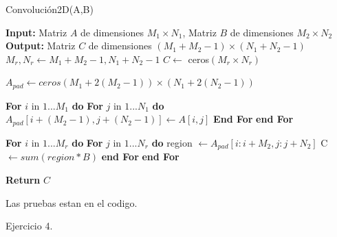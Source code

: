 \documentclass[11pt]{article}
\begin{document}
\begin{algorithm}
    \caption{Convolución2D(A,B)} %
    \begin{algorithmic}[1]
    \State \textbf{Input:} Matriz $A$ de dimensiones $M_1 \times N_1$, Matriz $B$ de dimensiones $M_2 \times N_2$
    \State \textbf{Output:} Matriz $C$ de dimensiones $(M_1 + M_2 - 1) \times (N_1 + N_2 - 1)$
    \State $M_r, N_r \leftarrow M_1 + M_2 - 1,  N_1 + N_2 - 1$
    \State  $C \leftarrow$ ceros$(M_r \times N_r)$
    
    \State  $A_{pad} \leftarrow ceros(M_1 + 2(M_2-1)) \times (N_1 + 2(N_2-1))$

    \State  \textbf{For} $i$ in $1...M_1$ \textbf{do}
    \State \hspace{1cm} \textbf{For} $j$ in $1...N_1$ \textbf{do}
    \State \hspace{2cm} $A_{pad}[i + (M_2-1), j + (N_2-1)] \leftarrow A[i,j]$ 
    \State \hspace{1cm} \textbf{End For}
    \State \textbf{end For}
    
    \State  \textbf{For} $i$ in $1...M_r$ \textbf{do}
    \State \hspace{1cm} \textbf{For} $j$ in $1...N_r$ \textbf{do}
    \State \hspace{2cm} region $\leftarrow A_{pad}[i:i+M_2,j:j+N_2]$
    \State \hspace{2cm} C $\leftarrow sum(region * B)$
    \State \hspace{1cm} \textbf{end For}
    \State \textbf{end For}
    
    \State \textbf{Return} $C$ 
    \end{algorithmic}
\end{algorithm}

Las pruebas estan en el codigo.\\ 

\newpage

Ejercicio 4. 
\end{document}
